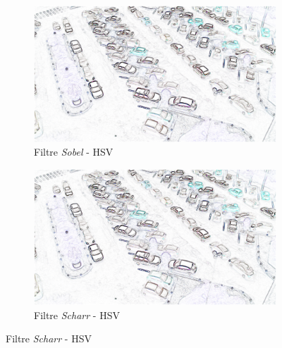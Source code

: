 \begin{appendix}
\begin{figure}[H]
    \bigskip
    \begin{subfigure}{.5\textwidth}
        \centering
        \includegraphics[width=.85\linewidth]{img/conception/image_process/downsample-edge/1.png}
        \caption{Filtre \textit{Sobel} - HSV}   
    \end{subfigure}%
    \begin{subfigure}{.5\textwidth}
        \centering
        \includegraphics[width=.85\linewidth]{img/conception/image_process/downsample-edge/4.png}
        \caption{Filtre \textit{Scharr} - HSV}
    \end{subfigure}%
    

\end{figure}
\end{appendix}
